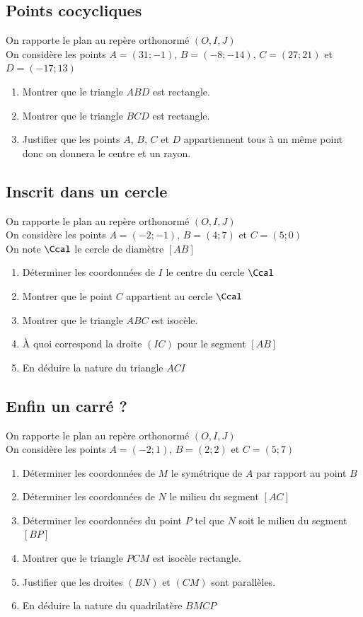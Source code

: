\documentclass[oneside,12pt]{article}          %
\begin{document}
\subsection{Points cocycliques}
On rapporte le plan au repère orthonormé $(O,I,J)$\\
On considère les points $A=(31;-1)$, $B=(-8;-14)$, $C=(27;21)$ et $D=(-17;13)$
\begin{enumerate}
	\item Montrer que le triangle $ABD$ est rectangle.
	\item Montrer que le triangle $BCD$ est rectangle.
	\item Justifier que les points $A$, $B$, $C$ et $D$ appartiennent tous à un même point donc on donnera le centre et un rayon.
\end{enumerate}



\subsection{Inscrit dans un cercle}
On rapporte le plan au repère orthonormé $(O,I,J)$\\
On considère les points $A=(-2;-1)$, $B=(4;7)$ et $C=(5;0)$\\
On note $\Ccal$ le cercle de diamètre $[AB]$
\begin{enumerate}
	\item Déterminer les coordonnées de $I$ le centre du cercle $\Ccal$
	\item Montrer que le point $C$ appartient au cercle $\Ccal$
	\item Montrer que le triangle $ABC$ est isocèle.
	\item À quoi correspond la droite $(IC)$ pour le segment $[AB]$
	\item En déduire la nature du triangle $ACI$
\end{enumerate}



\subsection{Enfin un carré ?}
On rapporte le plan au repère orthonormé $(O,I,J)$\\
On considère les points $A=(-2;1)$, $B=(2;2)$ et $C=(5;7)$
\begin{enumerate}
	\item Déterminer les coordonnées de $M$ le symétrique de $A$ par rapport au point $B$
	\item Déterminer les coordonnées de $N$ le milieu du segment $[AC]$
	\item Déterminer les coordonnées du point $P$  tel que $N$ soit le milieu du segment $[BP]$
	\item Montrer que le triangle $PCM$ est isocèle rectangle.
	\item Justifier que les droites $(BN)$ et $(CM)$ sont parallèles.
	\item En déduire la nature du quadrilatère $BMCP$
\end{enumerate}
\end{document}
